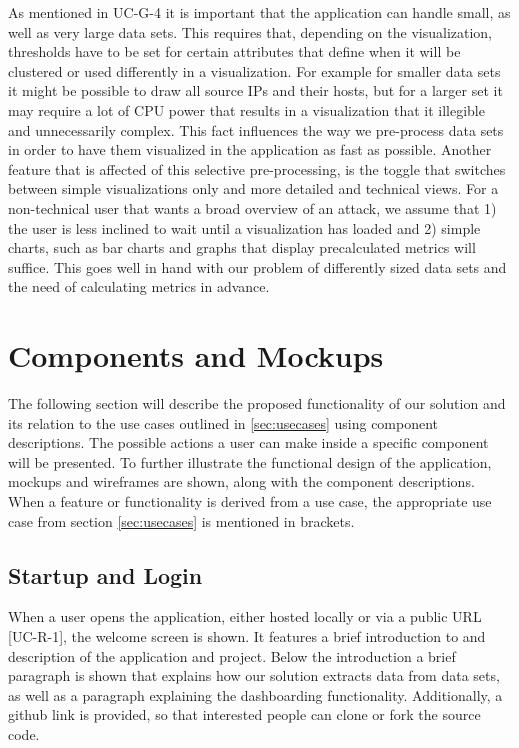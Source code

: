 As mentioned in UC-G-4 it is important that the application can handle small, as well as very large data sets. This requires that, depending on the visualization, thresholds have to be set for certain attributes that define when it will be clustered or used differently in a visualization. For example for smaller data sets it might be possible to draw all source IPs and their hosts, but for a larger set it may require a lot of CPU power that results in a visualization that it illegible and unnecessarily complex. This fact influences the way we pre-process data sets in order to have them visualized in the application as fast as possible. Another feature that is affected of this selective pre-processing, is the toggle that switches between simple visualizations only and more detailed and technical views. For a non-technical user that wants a broad overview of an attack, we assume that 1) the user is less inclined to wait until a visualization has loaded and 2) simple charts, such as bar charts and graphs that display precalculated metrics will suffice. This goes well in hand with our problem of differently sized data sets and the need of calculating metrics in advance.


\section{Components and Mockups}\label{components}
The following section will describe the proposed functionality of our solution and its relation to the use cases outlined in \ref{sec:usecases} using component descriptions. The possible actions a user can make inside a specific component will be presented. To further illustrate the functional design of the application, mockups and wireframes are shown, along with the component descriptions. When a feature or functionality is derived from a use case, the appropriate use case from section \ref{sec:usecases} is mentioned in brackets.

\subsection{Startup and Login}
When a user opens the application, either hosted locally or via a public URL [UC-R-1], the welcome screen is shown. It features a brief introduction to and description of the application and project. Below the introduction a brief paragraph is shown that explains how our solution extracts data from data sets, as well as a paragraph explaining the dashboarding functionality. Additionally, a github link is provided, so that interested people can clone or fork the source code. 

